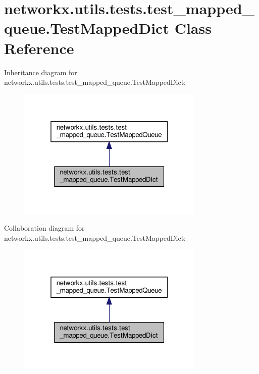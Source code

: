 \hypertarget{classnetworkx_1_1utils_1_1tests_1_1test__mapped__queue_1_1TestMappedDict}{}\section{networkx.\+utils.\+tests.\+test\+\_\+mapped\+\_\+queue.\+Test\+Mapped\+Dict Class Reference}
\label{classnetworkx_1_1utils_1_1tests_1_1test__mapped__queue_1_1TestMappedDict}


Inheritance diagram for networkx.\+utils.\+tests.\+test\+\_\+mapped\+\_\+queue.\+Test\+Mapped\+Dict\+:
\nopagebreak
\begin{figure}[H]
\begin{center}
\leavevmode
\includegraphics[width=253pt]{classnetworkx_1_1utils_1_1tests_1_1test__mapped__queue_1_1TestMappedDict__inherit__graph}
\end{center}
\end{figure}


Collaboration diagram for networkx.\+utils.\+tests.\+test\+\_\+mapped\+\_\+queue.\+Test\+Mapped\+Dict\+:
\nopagebreak
\begin{figure}[H]
\begin{center}
\leavevmode
\includegraphics[width=253pt]{classnetworkx_1_1utils_1_1tests_1_1test__mapped__queue_1_1TestMappedDict__coll__graph}
\end{center}
\end{figure}
